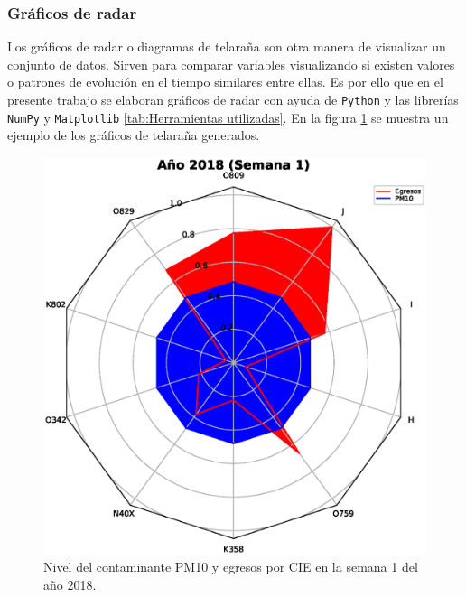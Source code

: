 
\subsubsection{Gráficos de radar}
Los gráficos de radar o diagramas de telaraña son otra manera de visualizar un conjunto de datos. Sirven para comparar variables visualizando si existen valores o patrones de evolución en el tiempo similares entre ellas. Es por ello que en el presente trabajo se elaboran gráficos de radar con ayuda de \texttt{Python} y las librerías \texttt{NumPy} y \texttt{Matplotlib} \ref{tab:Herramientas utilizadas}. En la figura \ref{grafico_de_telaraña} se muestra un ejemplo de los gráficos de telaraña generados.

\begin{figure}[h!]
\setcounter{figure}{0} %
\captionsetup{type=figure} %
\begin{center}
   \includegraphics[trim=0 0 0 74,clip,width=1\textwidth]{spiderweb_PM10_2018_1.eps}
   \end{center}
    \caption[Ejemplo de gráfico de radar]{Nivel del contaminante PM10 y egresos por CIE en la semana 1 del año 2018.}
    \label{grafico_de_telaraña}
\end{figure}

